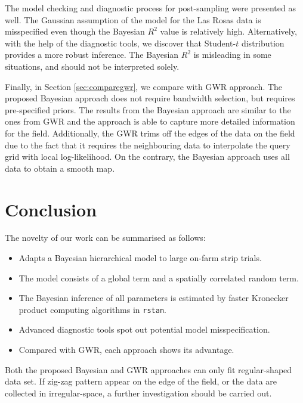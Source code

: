 \documentclass[a4paper]{article}   	%
\newcommand{\rstan}{\texttt{rstan}}
\begin{document}
	
	
	The model checking and diagnostic process for post-sampling were presented as well. The Gaussian assumption of the model for the Las Rosas data is misspecified even though the Bayesian $R^2$ value is relatively high. Alternatively, with the help of the diagnostic tools, we discover that Student-$t$ distribution provides a more robust inference. The Bayesian $R^2$ is misleading in some situations, and should not be interpreted solely. 
	
	
	
	Finally, in Section \ref{sec:comparegwr}, we compare with GWR approach. The proposed Bayesian approach does not require bandwidth selection, but requires pre-specified priors. The results from the Bayesian approach are similar to the ones from GWR and the approach is able to capture more detailed information for the field. Additionally, the GWR trims off the edges of the data on the field due to the fact that it requires the neighbouring data to interpolate the query grid with local log-likelihood. On the contrary, the Bayesian approach uses all data to obtain a smooth map. 
	
	
	
	\section{Conclusion}
	
	The novelty of our work can be summarised as follows:
	\begin{itemize}
		\item Adapts a Bayesian hierarchical model to large on-farm strip trials.
		\item The model consists of a global term and a spatially correlated random term.
		\item The Bayesian inference of all parameters is estimated by faster Kronecker product computing algorithms in \rstan.
		\item Advanced diagnostic tools spot out potential model misspecification. 
		\item Compared with GWR, each approach shows its advantage. 
	\end{itemize}
	
	Both the proposed Bayesian and GWR approaches can only fit regular-shaped data set. If zig-zag pattern appear on the edge of the field, or the data are collected in irregular-space, a further investigation should be carried out. 
	
	
	
\end{document}
